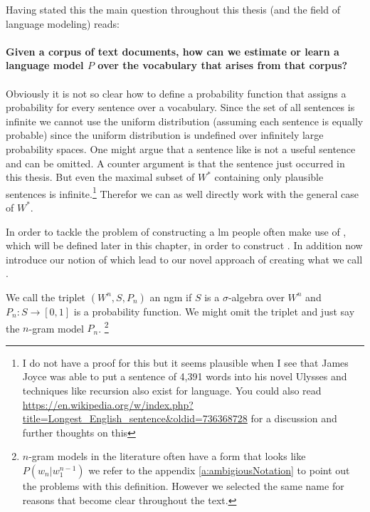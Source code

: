 \documentclass[•]{book}
\begin{document}
Having stated this the main question throughout this thesis (and the field of language modeling) reads:\\
\\
\textbf{Given a corpus of text documents, how can we estimate or learn a language model $P$ over the vocabulary that arises from that corpus?} 
\\
\\
Obviously it is not so clear how to define a probability function that assigns a probability for every sentence over a vocabulary. 
Since the set of all sentences is infinite we cannot use the uniform distribution (assuming each sentence is equally probable) since the uniform distribution is undefined over infinitely large probability spaces.  
One might argue that a sentence like  is not a useful sentence and can be omitted. 
A counter argument is that the sentence just occurred in this thesis. 
But even the maximal subset of $W^{*}$ containing only plausible sentences is infinite.\footnote{I do not have a proof for this but it seems plausible when I see that James Joyce was able to put a sentence of 4,391 words into his novel Ulysses and techniques like recursion also exist for language. You could also read \url{https://en.wikipedia.org/w/index.php?title=Longest_English_sentence&oldid=736368728} for a discussion and further thoughts on this}
Therefor we can as well directly work with the general case of $W^{*}$.

 In order to tackle the problem of constructing a \gls{lm} people often make use of , which will be defined later in this chapter, in order to construct . 
In addition now introduce our notion of  which lead to our novel approach of creating what we call . 

\begin{definition}\label{def:ngram-model}We call the triplet $(W^{n}, S, P_n)$ an \gls{ngm} if $S$ is a $\sigma$-algebra over $W^{n}$ and $P_n:S\longrightarrow [0,1]$ is a probability function. We might omit the triplet and just say the $n$-gram model $P_n$. \footnote{$n$-gram models in the literature often have a form that looks like $P(w_n|w_1^{n-1})$ we refer to the appendix \ref{a:ambigiousNotation} to point out the problems with this definition. However we selected the same name for reasons that become clear throughout the text.}
\end{definition}
\end{document}
